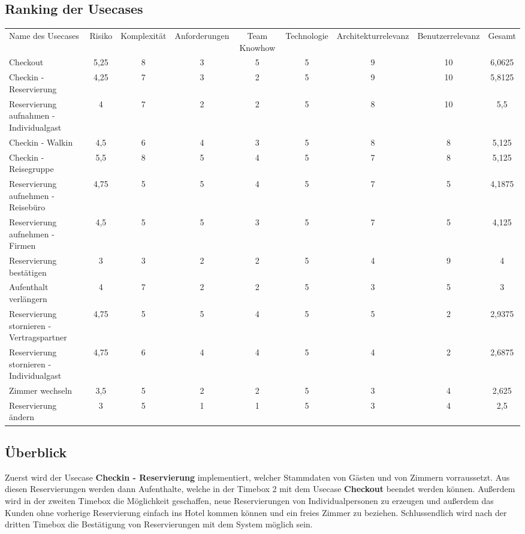 \subsection{Ranking der Usecases}

\begin{tabular} { l c c c c c c c c }

	Name des Usecases & Risiko & Komplexität & Anforderungen & Team Knowhow & Technologie& Architekturrelevanz & Benutzerrelevanz & Gesamt \\
	Checkout & 5,25 & 8 & 3 & 5 & 5 & 9 & 10 & 6,0625 \\
	Checkin - Reservierung & 4,25 & 7 & 3 & 2 & 5 & 9 & 10 & 5,8125 \\
	Reservierung aufnahmen - Individualgast & 4 & 7 & 2 & 2 & 5 & 8 & 10 & 5,5 \\
	Checkin - Walkin & 4,5 & 6 & 4 & 3 & 5 & 8 & 8 & 5,125 \\
	Checkin - Reisegruppe & 5,5 & 8 & 5 & 4 & 5 & 7 & 8 & 5,125 \\
	Reservierung aufnehmen - Reisebüro & 4,75 & 5 & 5 & 4 & 5 & 7 & 5 & 4,1875 \\
	Reservierung aufnehmen - Firmen & 4,5 & 5 & 5 & 3 & 5 & 7 & 5 & 4,125 \\
	Reservierung bestätigen & 3 & 3 & 2 & 2 & 5 & 4 & 9 & 4 \\
	Aufenthalt verlängern & 4 & 7 & 2 & 2 & 5 & 3 & 5 & 3 \\
	Reservierung stornieren - Vertragspartner & 4,75 & 5 & 5 & 4 & 5 & 5 & 2 & 2,9375 \\
	Reservierung stornieren - Individualgast & 4,75 & 6 & 4 & 4 & 5 & 4 & 2 & 2,6875 \\
	Zimmer wechseln & 3,5 & 5 & 2 & 2 & 5 & 3 & 4 & 2,625 \\
	Reservierung ändern & 3 & 5 & 1 & 1 & 5 & 3 & 4 & 2,5 \\
	
\end{tabular}



\subsection{Überblick}
Zuerst wird der Usecase \textbf{Checkin - Reservierung} implementiert, welcher Stammdaten von Gästen und von Zimmern vorraussetzt.
Aus diesen Reservierungen werden dann Aufenthalte, welche in der Timebox 2 mit dem Usecase \textbf{Checkout} beendet werden können.
Außerdem wird in der zweiten Timebox die Möglichkeit geschaffen, neue \Gls{Reservierung}en von Individualpersonen zu erzeugen und außerdem
das Kunden ohne vorherige \Gls{Reservierung} einfach ins Hotel kommen können und ein freies Zimmer zu beziehen.
Schlussendlich wird nach der dritten Timebox die Bestätigung von Reservierungen mit dem System möglich sein.


